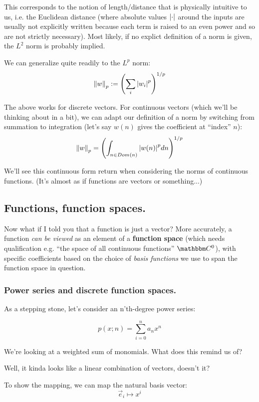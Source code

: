 \documentclass[../main/main.tex]{subfiles}
\begin{document}
This corresponds to the notion of
length/distance that is physically intuitive to us,
i.e. the Euclidean distance (where absolute values 
\(\abs{\cdot}\) around the inputs
are usually not explicitly written because each term
is raised to an even power and so are not strictly necessary).
Most likely, if no explict definition of a norm is given,
the \(L^2\) norm is probably implied.\par
We can generalize quite readily to the \(L^p\) norm:
\[\norm{w}_p := \left(\sum_{i} \abs{w_i}^p\right)^{1/p}\]

The above works for discrete vectors. 
For continuous vectors (which we'll be thinking about in a bit),
we can adapt our definition of a norm
by switching from summation to
integration (let's say \(w(n)\) gives the coefficient at
``index'' \(n\)):
\[\norm{w}_p = \left(\int_{n \in Dom(n)} \abs{w(n)}^p dn\right)^{1/p} \]

We'll see this continuous form return when considering
the norms of continuous functions. (It's almost as if
functions are vectors or something...)

\subsection{Functions, function spaces.}

Now what if I told you that a function is just a vector?
More accurately, a function \emph{can be viewed}
as an element of a \textbf{function space} (which needs qualification \textemdash{}
e.g. ``the space of all continuous functions'' \(\domain{C}^0\)), 
with specific coefficients
based on the choice of \emph{basis functions} we use to span the function space in question.

\subsubsection{Power series and discrete function spaces.}


As a stepping stone, let's consider an n'th-degree power series:

\[p(x;n) = \sum_{i=0}^{n}a_n x^n \]

We're looking at a weighted sum of monomials. 
What does this remind us of?\par

Well, it kinda looks like a linear combination of vectors, doesn't it?\par

To show the mapping, we can map the natural basis vector:
\[\vec{e}_i \mapsto x^i \]
\end{document}
